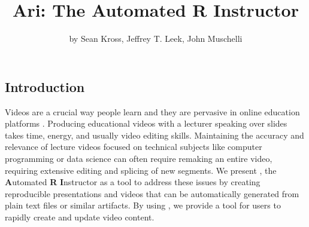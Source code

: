 \title{Ari: The Automated R Instructor}
\author{by Sean Kross, Jeffrey T. Leek, John Muschelli}

\maketitle


\hypertarget{introduction}{%
\subsection{Introduction}\label{introduction}}

Videos are a crucial way people learn and they are pervasive in online
education platforms \citep{hsin2013short, hartsell2006video}. Producing
educational videos with a lecturer speaking over slides takes time,
energy, and usually video editing skills. Maintaining the accuracy and
relevance of lecture videos focused on technical subjects like computer
programming or data science can often require remaking an entire video,
requiring extensive editing and splicing of new segments. We present
, the \textbf{A}utomated \textbf{R} \textbf{I}nstructor as
a tool to address these issues by creating reproducible presentations
and videos that can be automatically generated from plain text files or
similar artifacts. By using , we provide a tool for users to
rapidly create and update video content.

